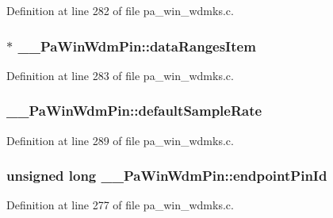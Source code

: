 Definition at line 282 of file pa\+\_\+win\+\_\+wdmks.\+c.

\subsubsection[{\texorpdfstring{data\+Ranges\+Item}{dataRangesItem}}]{$\ast$ \+\_\+\+\_\+\+Pa\+Win\+Wdm\+Pin\+::data\+Ranges\+Item}\hypertarget{struct_____pa_win_wdm_pin_ad7e5f835e21d79bb012d4a369e2437cd}{}\label{struct_____pa_win_wdm_pin_ad7e5f835e21d79bb012d4a369e2437cd}


Definition at line 283 of file pa\+\_\+win\+\_\+wdmks.\+c.

\subsubsection[{\texorpdfstring{default\+Sample\+Rate}{defaultSampleRate}}]{ \+\_\+\+\_\+\+Pa\+Win\+Wdm\+Pin\+::default\+Sample\+Rate}\hypertarget{struct_____pa_win_wdm_pin_a690270ec5eb11c10a9a669edab5b5aa6}{}\label{struct_____pa_win_wdm_pin_a690270ec5eb11c10a9a669edab5b5aa6}


Definition at line 289 of file pa\+\_\+win\+\_\+wdmks.\+c.

\subsubsection[{\texorpdfstring{endpoint\+Pin\+Id}{endpointPinId}}]{\setlength{\rightskip}{0pt plus 5cm}unsigned long \+\_\+\+\_\+\+Pa\+Win\+Wdm\+Pin\+::endpoint\+Pin\+Id}\hypertarget{struct_____pa_win_wdm_pin_a3f3942f6c97d908f03f559998a1daafb}{}\label{struct_____pa_win_wdm_pin_a3f3942f6c97d908f03f559998a1daafb}


Definition at line 277 of file pa\+\_\+win\+\_\+wdmks.\+c.

